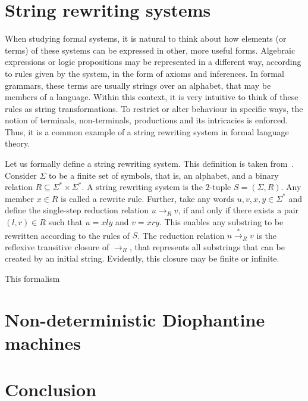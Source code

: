 \documentclass[12pt]{article}
\begin{document}
\section{String rewriting systems}\label{sec:srs}

When studying formal systems, it is natural to think about how elements (or terms) of these systems can be expressed in other, more useful forms. Algebraic expressions or logic propositions may be represented in a different way, according to rules given by the system, in the form of axioms and inferences. In formal grammars, these terms are usually strings over an alphabet, that may be members of a language. Within this context, it is very intuitive to think of these rules as string transformations. To restrict or alter behaviour in specific ways, the notion of terminals, non-terminals, productions and its intricacies is enforced. Thus, it is a common example of a string rewriting system in formal language theory.

Let us formally define a string rewriting system. This definition is taken from~\cite{}. Consider $\Sigma$ to be a finite set of symbols, that is, an alphabet, and a binary relation $R \subseteq \Sigma^{*} \times \Sigma^{*}$. A string rewriting system is the $2$-tuple $S = (\Sigma, R)$. Any member $x \in R$ is called a rewrite rule. Further, take any words $u, v, x, y \in \Sigma^{*}$ and define the single-step reduction relation $u \rightarrow_{R} v$, if and only if there exists a pair $(l, r) \in R$ such that $u = xly$ and $v = xry$. This enables any substring to be rewritten according to the rules of $S$. The reduction relation $u \stackrel{*}{\rightarrow}_{R} v$ is the reflexive transitive closure of $\rightarrow_{R}$, that represents all substrings that can be created by an initial string. Evidently, this closure may be finite or infinite.

This formalism 



\section{Non-deterministic Diophantine machines}\label{sec:nddm}

\section{Conclusion}\label{sec:conc}



\end{document}
